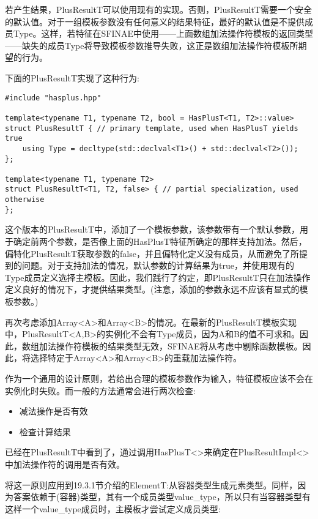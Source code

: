 若产生结果，PlusResultT可以使用现有的实现。否则，PlusResultT需要一个安全的默认值。对于一组模板参数没有任何意义的结果特征，最好的默认值是不提供成员Type。这样，若特征在SFINAE中使用——上面数组加法操作符模板的返回类型——缺失的成员Type将导致模板参数推导失败，这正是数组加法操作符模板所期望的行为。

下面的PlusResultT实现了这种行为:

\begin{lstlisting}[style=styleCXX]
#include "hasplus.hpp"

template<typename T1, typename T2, bool = HasPlusT<T1, T2>::value>
struct PlusResultT { // primary template, used when HasPlusT yields true
	using Type = decltype(std::declval<T1>() + std::declval<T2>());
};

template<typename T1, typename T2>
struct PlusResultT<T1, T2, false> { // partial specialization, used otherwise
};
\end{lstlisting}

这个版本的PlusResultT中，添加了一个模板参数，该参数带有一个默认参数，用于确定前两个参数，是否像上面的HasPlusT特征所确定的那样支持加法。然后，偏特化PlusResultT获取参数的false，并且偏特化定义没有成员，从而避免了所提到的问题。对于支持加法的情况，默认参数的计算结果为true，并使用现有的Type成员定义选择主模板。因此，我们践行了约定，即PlusResultT只在加法操作定义良好的情况下，才提供结果类型。(注意，添加的参数永远不应该有显式的模板参数。)

再次考虑添加Array<A>和Array<B>的情况。在最新的PlusResultT模板实现中，PlusResultT<A,B>的实例化不会有Type成员，因为A和B的值不可求和。因此，数组加法操作符模板的结果类型无效，SFINAE将从考虑中剔除函数模板。因此，将选择特定于Array<A>和Array<B>的重载加法操作符。

作为一个通用的设计原则，若给出合理的模板参数作为输入，特征模板应该不会在实例化时失败。而一般的方法通常会进行两次检查:

\begin{itemize}
\item
减法操作是否有效

\item
检查计算结果
\end{itemize}

已经在PlusResultT中看到了，通过调用HasPlusT<>来确定在PlusResultImpl<>中加法操作符的调用是否有效。

将这一原则应用到19.3.1节介绍的ElementT:从容器类型生成元素类型。同样，因为答案依赖于(容器)类型，其有一个成员类型value\_type，所以只有当容器类型有这样一个value\_type成员时，主模板才尝试定义成员类型:

